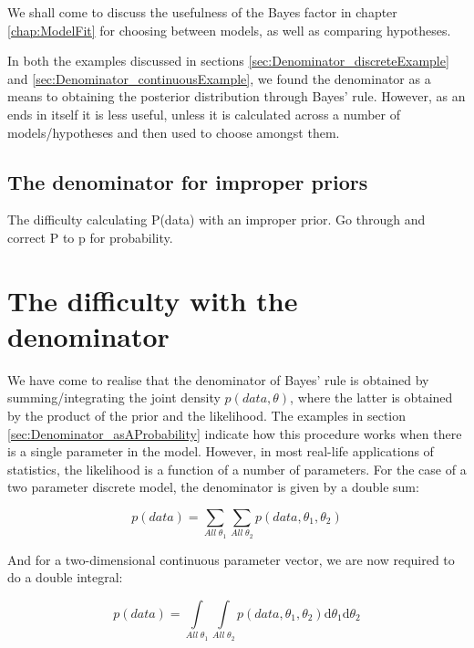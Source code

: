 \documentclass[11pt,fullpage]{book}
\begin{document}
We shall come to discuss the usefulness of the Bayes factor in chapter \ref{chap:ModelFit} for choosing between models, as well as comparing hypotheses.

In both the examples discussed in sections \ref{sec:Denominator_discreteExample} and \ref{sec:Denominator_continuousExample}, we found the denominator as a means to obtaining the posterior distribution through Bayes' rule. However, as an ends in itself it is less useful, unless it is calculated across a number of models/hypotheses and then used to choose amongst them.

\subsection{The denominator for improper priors}
The difficulty calculating P(data) with an improper prior.
Go through and correct P to p for probability.

\section{The difficulty with the denominator}\label{sec:Denominator_difficulty}
We have come to realise that the denominator of Bayes' rule is obtained by summing/integrating the joint density $p(data,\theta)$, where the latter is obtained by the product of the prior and the likelihood. The examples in section \ref{sec:Denominator_asAProbability} indicate how this procedure works when there is a single parameter in the model. However, in most real-life applications of statistics, the likelihood is a function of a number of parameters. For the case of a two parameter discrete model, the denominator is given by a double sum:

\begin{equation}\label{eq:Denominator_doubleSum}
p(data) = \sum\limits_{All\;\theta_1}\sum\limits_{All\;\theta_2}p(data,\theta_1,\theta_2)
\end{equation}

And for a two-dimensional continuous parameter vector, we are now required to do a double integral:

\begin{equation}\label{eq:Denominator_doubleIntegral}
p(data) = \int\limits_{All\;\theta_1}\int\limits_{All\;\theta_2}p(data,\theta_1,\theta_2)\mathrm{d}\theta_1\mathrm{d}\theta_2
\end{equation}
\end{document}
